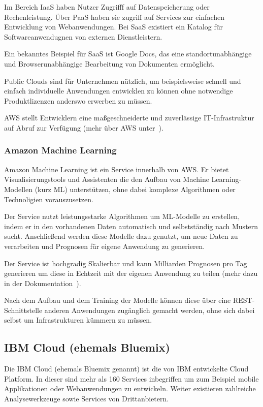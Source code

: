 Im Bereich IaaS haben Nutzer Zugrifff auf Datenspeicherung oder Rechenleistung. Über PaaS haben sie zugriff auf
Services zur einfachen Entwicklung von Webanwendungen. Bei SaaS existiert ein Katalog für Softwareanwendugnen von
externen Dienstleistern.

Ein bekanntes Beispiel für SaaS ist Google Docs, das eine standortunabhängige und Browserunabhängige Bearbeitung von
Dokumenten ermöglicht.

Public Clouds sind für Unternehmen nützlich, um beispielsweise schnell und einfach individuelle Anwendungen entwicklen
zu können ohne notwendige Produktlizenzen anderswo erwerben zu müssen.

AWS stellt Entwicklern eine maßgeschneiderte und zuverlässige IT-Infrastruktur auf Abruf zur Verfügung
(mehr über AWS unter~\cite{online_grundlagen_aws}).

\subsubsection{Amazon Machine Learning}
Amazon Machine Learning ist ein Service innerhalb von AWS. Er bietet Visualisierungstools und Assistenten die den Aufbau
von Machine Learning-Modellen (kurz ML) unterstützen, ohne dabei komplexe Algorithmen oder Technoligien vorauszusetzen.

Der Service nutzt leistungsstarke Algorithmen um ML-Modelle zu erstellen, indem er in den vorhandenen Daten automatisch
und selbstständig nach Mustern sucht. Anschließend werden diese Modelle dazu genutzt, um neue Daten zu verarbeiten und
Prognosen für eigene Anwendung zu generieren.

Der Service ist hochgradig Skalierbar und kann Milliarden Prognosen pro Tag generieren um diese in Echtzeit mit der
eigenen Anwendung zu teilen (mehr dazu in der Dokumentation~\cite{online_grundlagen_aws_learning}).

Nach dem Aufbau und dem Training der Modelle können diese über eine REST-Schnittstelle anderen Anwendungen zugänglich
gemacht werden, ohne sich dabei selbst um Infrastrukturen kümmern zu müssen.

\subsection{IBM Cloud (ehemals Bluemix)}
Die IBM Cloud (ehemals Bluemix genannt) ist die von IBM entwickelte Cloud Platform. In dieser sind mehr als 160 Services
inbegriffen um zum Beispiel mobile Applikationen oder Webanwendungen zu entwickeln. Weiter existieren zahlreiche
Analysewerkzeuge sowie Services von Drittanbietern.

